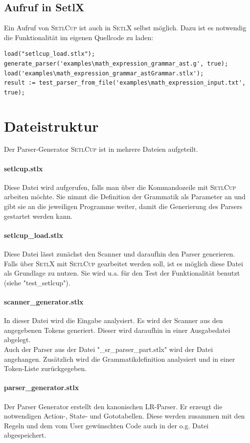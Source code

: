 \subsection{Aufruf in SetlX}
Ein Aufruf von \textsc{SetlCup} ist auch in \textsc{SetlX} selbst möglich. Dazu ist es notwendig die Funktionalität im eigenen Quellcode zu laden:
\begin{Verbatim}
load("setlcup_load.stlx");
generate_parser('examples\math_expression_grammar_ast.g', true);
load('examples\math_expression_grammar_astGrammar.stlx');
result := test_parser_from_file('examples\math_expression_input.txt', true);
\end{Verbatim}
\section{Dateistruktur}
Der Parser-Generator \textsc{SetlCup} ist in mehrere Dateien aufgeteilt.
\paragraph{setlcup.stlx} Diese Datei wird aufgerufen, falls man über die Kommandozeile mit \textsc{SetlCup} arbeiten möchte. Sie nimmt die Definition der Grammatik als Parameter an und gibt sie an die jeweiligen Programme weiter, damit die Generierung des Parsers gestartet werden kann.
\paragraph{setlcup\_load.stlx} Diese Datei lässt zunächst den Scanner und daraufhin den Parser generieren. Falls über \textsc{SetlX} mit \textsc{SetlCup} gearbeitet werden soll, ist es möglich diese Datei als Grundlage zu nutzen. Sie wird u.a. für den Test der Funktionalität benutzt (siehe "test\_setlcup").
\paragraph{scanner\_generator.stlx} In dieser Datei wird die Eingabe analysiert. Es wird der Scanner aus den angegebenen Tokens generiert. Dieser wird daraufhin in einer Ausgabedatei abgelegt. \\
Auch der Parser aus der Datei "\_sr\_parser\_part.stlx" wird der Datei angehangen. Zusätzlich wird die Grammatikdefinition analysiert und  in einer Token-Liste zurückgegeben.
\paragraph{parser\_generator.stlx} Der Parser Generator erstellt den kanonischen LR-Parser. Er erzeugt die notwendigen Action-, State- und Gototabellen. Diese werden zusammen mit den Regeln und dem vom User gewünschten Code auch in der o.g. Datei abgespeichert. 
